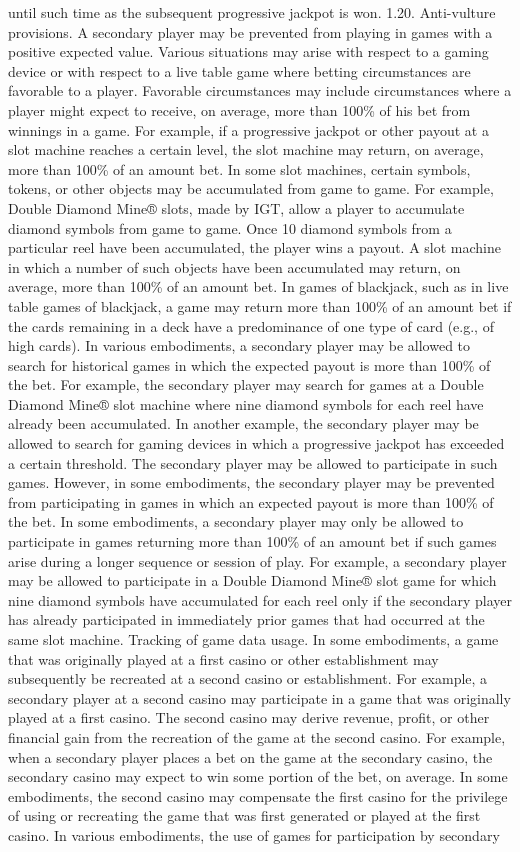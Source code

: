 \documentclass[11pt,a4paper]{article}
\begin{document}
until such time as the subsequent progressive jackpot is won. 1.20. Anti-vulture provisions. A secondary player may be prevented from playing in games with a positive expected value. Various situations may arise with respect to a gaming device or with respect to a live table game where betting circumstances are favorable to a player. Favorable circumstances may include circumstances where a player might expect to receive, on average, more than 100\% of his bet from winnings in a game. For example, if a progressive jackpot or other payout at a slot machine reaches a certain level, the slot machine may return, on average, more than 100\% of an amount bet. In some slot machines, certain symbols, tokens, or other objects may be accumulated from game to game. For example, Double Diamond Mine® slots, made by IGT, allow a player to accumulate diamond symbols from game to game. Once 10 diamond symbols from a particular reel have been accumulated, the player wins a payout. A slot machine in which a number of such objects have been accumulated may return, on average, more than 100\% of an amount bet. In games of blackjack, such as in live table games of blackjack, a game may return more than 100\% of an amount bet if the cards remaining in a deck have a predominance of one type of card (e.g., of high cards). In various embodiments, a secondary player may be allowed to search for historical games in which the expected payout is more than 100\% of the bet. For example, the secondary player may search for games at a Double Diamond Mine® slot machine where nine diamond symbols for each reel have already been accumulated. In another example, the secondary player may be allowed to search for gaming devices in which a progressive jackpot has exceeded a certain threshold. The secondary player may be allowed to participate in such games. However, in some embodiments, the secondary player may be prevented from participating in games in which an expected payout is more than 100\% of the bet. In some embodiments, a secondary player may only be allowed to participate in games returning more than 100\% of an amount bet if such games arise during a longer sequence or session of play. For example, a secondary player may be allowed to participate in a Double Diamond Mine® slot game for which nine diamond symbols have accumulated for each reel only if the secondary player has already participated in immediately prior games that had occurred at the same slot machine. Tracking of game data usage. In some embodiments, a game that was originally played at a first casino or other establishment may subsequently be recreated at a second casino or establishment. For example, a secondary player at a second casino may participate in a game that was originally played at a first casino. The second casino may derive revenue, profit, or other financial gain from the recreation of the game at the second casino. For example, when a secondary player places a bet on the game at the secondary casino, the secondary casino may expect to win some portion of the bet, on average. In some embodiments, the second casino may compensate the first casino for the privilege of using or recreating the game that was first generated or played at the first casino. In various embodiments, the use of games for participation by secondary 
\end{document}

